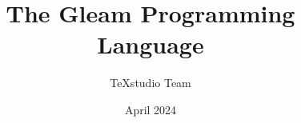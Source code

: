 \documentclass[a4paper,12pt]{book}
\begin{document}
\author{TeXstudio Team}
\title{The Gleam Programming Language}
\date{April 2024}

\frontmatter
\maketitle
\tableofcontents

\mainmatter



\backmatter
\end{document}
